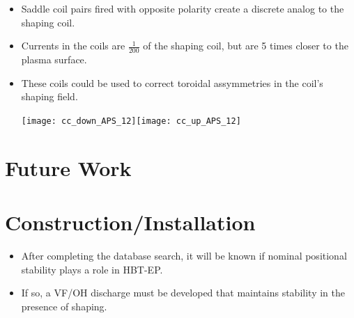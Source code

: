 \documentclass{article}
\begin{document}
\begin{multicols}{5}
\begin{itemize}
\item Saddle coil pairs fired with opposite polarity create a discrete analog to the shaping coil.
\item Currents in the coils are $\frac{1}{200}$ of the shaping coil, but are 5 times closer to the plasma surface.
\item These coils could be used to correct toroidal assymmetries in the coil's shaping field.

\texttt{[image: cc\_down\_APS\_12]}\texttt{[image: cc\_up\_APS\_12]}


\end{itemize}

\section{Future Work}

\section*{Construction/Installation}
\begin{itemize}
\item After completing the database search, it will be known if nominal positional stability plays a role in HBT-EP.
\item If so, a VF/OH discharge must be developed that maintains stability in the presence of shaping.


\end{itemize}
\end{multicols}
\end{document}
